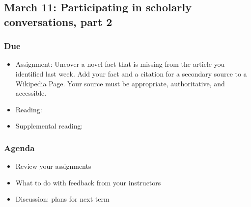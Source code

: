 \documentclass[12pt,article,oneside]{memoir}
\begin{document}
\subsection{March 11: Participating in scholarly conversations, part 2}
\subsubsection{Due}
\begin{itemize}
 \item Assignment: Uncover a novel fact that is missing from the article you identified last week.  Add your fact and a citation for a secondary source to a Wikipedia Page.  Your source must be appropriate, authoritative, and accessible.
 \item Reading: \cite{eryk}
 \item Supplemental reading: \cite{doyle}
\end{itemize}

\subsubsection{Agenda}
\begin{itemize}
\item Review your assignments
\item What to do with feedback from your instructors
\item Discussion: plans for next term
\end{itemize}


\newpage
\renewcommand{\bibname}{Reading list}
{}

\end{document}
